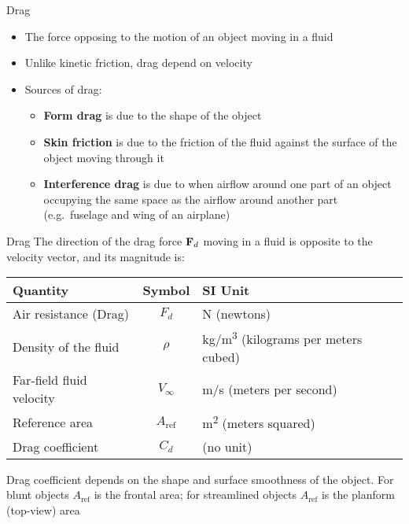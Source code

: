 \documentclass[12pt,compress,aspectratio=169]{beamer}
\newcommand{\mb}[1]{\ensuremath\mathbf{#1}}
\newcommand{\eq}[2]{\vspace{#1}{\Large\begin{displaymath}#2\end{displaymath}}}
\begin{document}
\begin{frame}{Drag}
  \begin{itemize}
  \item The force opposing to the motion of an object moving in a fluid
  \item Unlike kinetic friction, drag depend on velocity\footnotemark
  \item Sources of drag:
    \begin{itemize}
    \item\textbf{Form drag} is due to the shape of the object
    \item\textbf{Skin friction} is due to the friction of the fluid against
      the surface of the object moving through it
    \item\textbf{Interference drag} is due to when airflow around one part of
      an object occupying the same space as the airflow around another part
      (e.g.\ fuselage and wing of an airplane)
    \end{itemize}
  \end{itemize}
\end{frame}



\begin{frame}{Drag}
  The direction of the drag force $\mb{F}_d$ moving in a fluid is opposite to
  the velocity vector, and its magnitude is:

  \eq{-.2in}{
    F_d=\frac{1}{2}\rho V_\infty^2A_\mathrm{ref}C_d
  }
  
  \begin{center}
    \begin{tabular}{l|c|l}
      \rowcolor{pink}
      \textbf{Quantity} & \textbf{Symbol} & \textbf{SI Unit} \\ \hline
      Air resistance (Drag) & $F_d$  & \si{\newton} (newtons)\\
      Density of the fluid & $\rho$ & \si{\kg/\m^3}
      (kilograms per meters cubed)\\
      Far-field fluid velocity & $V_\infty$ & \si{\m/\s} (meters per second) \\
      Reference area   & $A_\mathrm{ref}$ & \si{m^2} (meters squared) \\
      Drag coefficient & $C_d$ & (no unit)
    \end{tabular}
  \end{center}
  
  {\footnotesize Drag coefficient depends on the shape and surface smoothness
    of the object. For blunt objects $A_\mathrm{ref}$ is the frontal area; for
    streamlined objects $A_\mathrm{ref}$ is the planform (top-view) area\par}
\end{frame}
\end{document}
